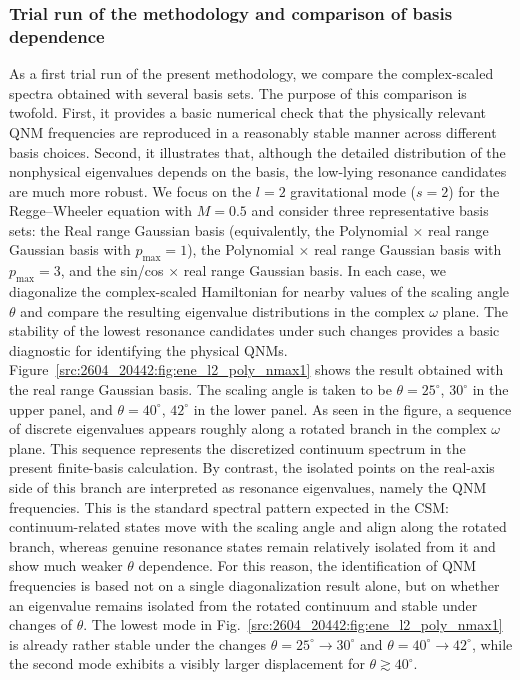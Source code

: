 \subsubsection{Trial run of the methodology and comparison of basis dependence}
As a first trial run of the present methodology, we compare the complex-scaled spectra obtained with several basis sets.
The purpose of this comparison is twofold.
First, it provides a basic numerical check that the physically relevant QNM frequencies are reproduced in a reasonably stable manner across different basis choices.
Second, it illustrates that, although the detailed distribution of the nonphysical eigenvalues depends on the basis, the low-lying resonance candidates are much more robust.
We focus on the $l=2$ gravitational mode ($s=2$) for the Regge--Wheeler equation with $M=0.5$ and consider three representative basis sets: the Real range Gaussian basis (equivalently, the Polynomial $\times$ real range Gaussian basis with $p_{\max}=1$), the Polynomial $\times$ real range Gaussian basis with $p_{\max}=3$, and the sin/cos $\times$ real range Gaussian basis.
In each case, we diagonalize the complex-scaled Hamiltonian for nearby values of the scaling angle $\theta$ and compare the resulting eigenvalue distributions in the complex $\omega$ plane.
The stability of the lowest resonance candidates under such changes provides a basic diagnostic for identifying the physical QNMs.
Figure~\ref{src:2604_20442:fig:ene_l2_poly_nmax1} shows the result obtained with the real range Gaussian basis.
The scaling angle is taken to be $\theta=25^\circ$, $30^\circ$ in the upper panel, and $\theta=40^\circ$, $42^\circ$ in the lower panel.
As seen in the figure, a sequence of discrete eigenvalues appears roughly along a rotated branch in the complex $\omega$ plane.
This sequence represents the discretized continuum spectrum in the present finite-basis calculation.
By contrast, the isolated points on the real-axis side of this branch are interpreted as resonance eigenvalues, namely the QNM frequencies.
This is the standard spectral pattern expected in the CSM: continuum-related states move with the scaling angle and align along the rotated branch, whereas genuine resonance states remain relatively isolated from it and show much weaker $\theta$ dependence.
For this reason, the identification of QNM frequencies is based not on a single diagonalization result alone, but on whether an eigenvalue remains isolated from the rotated continuum and stable under changes of $\theta$.
The lowest mode in Fig.~\ref{src:2604_20442:fig:ene_l2_poly_nmax1} is already rather stable under the changes $\theta=25^\circ \to 30^\circ$ and $\theta=40^\circ \to 42^\circ$, while the second mode exhibits a visibly larger displacement for $\theta \gtrsim 40^\circ$.

